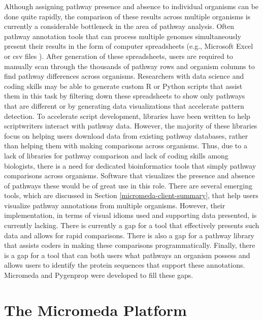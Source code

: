 Although assigning pathway presence and absence to individual organisms can be done quite rapidly, the comparison of these results across multiple organisms is currently a considerable bottleneck in the area of pathway analysis. Often pathway annotation tools that can process multiple genomes simultaneously present their results in the form of computer spreadsheets (e.g., Microsoft Excel or \gls{csv} files \cite{RFC4180}). After generation of these spreadsheets, users are required to manually scan through the thousands of pathway rows and organism columns to find pathway differences across organisms. Researchers with data science and coding skills may be able to generate custom R or Python scripts that assist them in this task by filtering down these spreadsheets to show only pathways that are different or by generating data visualizations that accelerate pattern detection. To accelerate script development, libraries have been written to help scriptwriters interact with pathway data. However, the majority of these libraries focus on helping users download data from existing pathway databases, rather than helping them with making comparisons across organisms. Thus, due to a lack of libraries for pathway comparison and lack of coding skills among biologists, there is a need for dedicated bioinformatics tools that simply pathway comparisons across organisms. Software that visualizes the presence and absence of pathways these would be of great use in this role. There are several emerging tools, which are discussed in Section \ref{micromeda-client-summary}, that help users visualize pathway annotations from multiple organisms. However, their implementation, in terms of visual idioms used and supporting data presented, is currently lacking. There is currently a gap for a tool that effectively presents such data and allows for rapid comparisons. There is also a gap for a pathway library that assists coders in making these comparisons programmatically. Finally, there is a gap for a tool that can both users what pathways an organism possess and allows users to identify the protein sequences that support these annotations. Micromeda and Pygenprop were developed to fill these gaps.

\section{The Micromeda Platform} \label{micromeda-overview}

